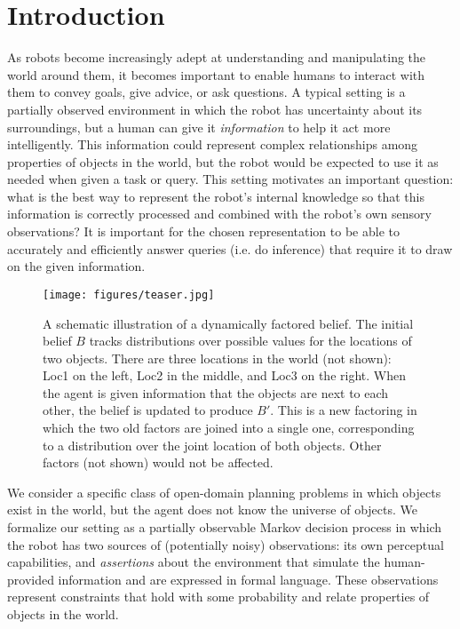 \section{Introduction}
As robots become increasingly adept at understanding and manipulating
the world around them, it becomes important to enable humans to
interact with them to convey goals, give advice, or ask questions. A
typical setting is a partially observed environment in which the robot
has uncertainty about its surroundings, but a human can give it
\emph{information} to help it act more intelligently. This information
could represent complex relationships among properties of objects in
the world, but the robot would be expected to use it as needed when
given a task or query. This setting motivates an important question:
what is the best way to represent the robot's internal knowledge so
that this information is correctly processed and combined with the
robot's own sensory observations? It is important for the chosen
representation to be able to accurately and efficiently answer queries
(i.e. do inference) that require it to draw on the given information.

\begin{figure}[t]
  \centering
    \noindent
    \texttt{[image: figures/teaser.jpg]}
    \caption{A schematic illustration of a dynamically factored
      belief. The initial belief $B$ tracks distributions over
      possible values for the locations of two objects. There are
      three locations in the world (not shown): Loc1 on the left, Loc2
      in the middle, and Loc3 on the right. When the agent is given
      information that the objects are next to each other, the belief
      is updated to produce $B'$. This is a new factoring in which the
      two old factors are joined into a single one, corresponding to a
      distribution over the joint location of both objects. Other
      factors (not shown) would not be affected.}
  \label{fig:teaser}
\end{figure}

We consider a specific class of open-domain planning problems in which
objects exist in the world, but the agent does not know the universe
of objects. We formalize our setting as a partially observable Markov
decision process in which the robot has two sources of (potentially
noisy) observations: its own perceptual capabilities, and
\emph{assertions} about the environment that simulate the human-provided
information and are expressed in formal language. These observations
represent constraints that hold with some probability and relate
properties of objects in the world.

